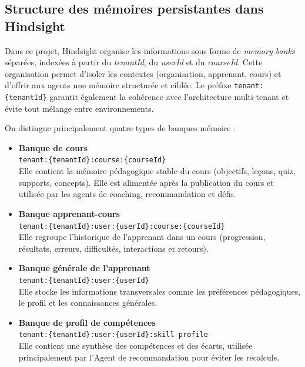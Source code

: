 \subsection{Structure des mémoires persistantes dans Hindsight}

Dans ce projet, Hindsight organise les informations sous forme de \textit{memory banks} séparées, indexées à partir du \textit{tenantId}, du \textit{userId} et du \textit{courseId}. Cette organisation permet d'isoler les contextes (organisation, apprenant, cours) et d'offrir aux agents une mémoire structurée et ciblée. Le préfixe \texttt{tenant:\{tenantId\}} garantit également la cohérence avec l'architecture multi-tenant et évite tout mélange entre environnements.

On distingue principalement quatre types de banques mémoire :

\begin{itemize}
    \item \textbf{Banque de cours} \\
    \texttt{tenant:\{tenantId\}:course:\{courseId\}} \\
    Elle contient la mémoire pédagogique stable du cours (objectifs, leçons, quiz, supports, concepts). Elle est alimentée après la publication du cours et utilisée par les agents de coaching, recommandation et défis.

    \item \textbf{Banque apprenant-cours} \\
    \texttt{tenant:\{tenantId\}:user:\{userId\}:course:\{courseId\}} \\
    Elle regroupe l'historique de l'apprenant dans un cours (progression, résultats, erreurs, difficultés, interactions et retours).

    \item \textbf{Banque générale de l'apprenant} \\
    \texttt{tenant:\{tenantId\}:user:\{userId\}} \\
    Elle stocke les informations transversales comme les préférences pédagogiques, le profil et les connaissances générales.

    \item \textbf{Banque de profil de compétences} \\
    \texttt{tenant:\{tenantId\}:user:\{userId\}:skill-profile} \\
    Elle contient une synthèse des compétences et des écarts, utilisée principalement par l'Agent de recommandation pour éviter les recalculs.
\end{itemize}

